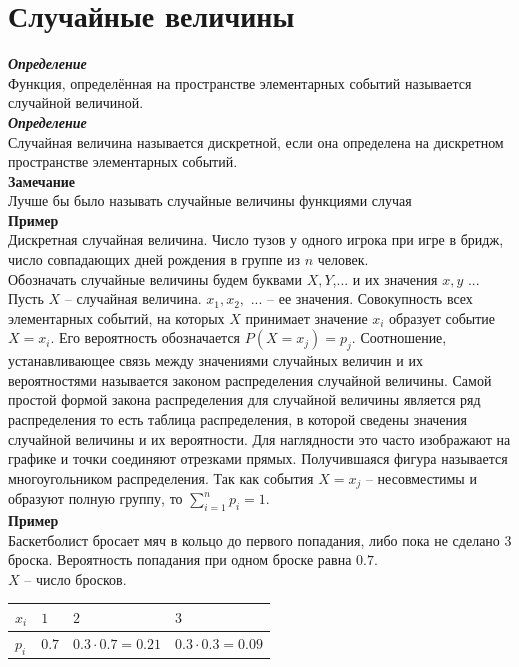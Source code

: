 \documentclass[russian, 12pt, fleqn]{article}
\begin{document}
\section{Случайные величины}
\noindent
\textit{\textbf{Определение}}\\
Функция, определённая на пространстве элементарных событий называется случайной величиной.\\
\textit{\textbf{Определение}}\\
Случайная величина называется дискретной, если она определена на дискретном пространстве элементарных событий.\\
\textbf{Замечание\ } \\ Лучше бы было называть случайные величины функциями случая\\
\textbf{Пример\ }\\Дискретная случайная величина. Число тузов у одного игрока при игре в бридж, число совпадающих дней рождения в группе из $n$ человек.\\
Обозначать случайные величины будем буквами $X, Y$,... и их значения $x, y$ ...
Пусть $X$ -- случайная величина. $x_1, x_2,$ ...  --  ее значения. Совокупность всех элементарных событий, на которых $X$ принимает значение $x_i$ образует событие $X=x_i$.
Его вероятность обозначается $P(X=x_j) = p_j$. Соотношение, устанавливающее связь между значениями случайных величин и их вероятностями называется законом распределения случайной величины. Самой простой формой закона распределения для случайной величины является ряд распределения то есть таблица распределения, в которой сведены значения случайной величины и их вероятности. Для наглядности это часто изображают на графике и точки соединяют отрезками прямых. Получившаяся фигура называется многоугольником распределения. Так как события $X=x_j$ -- несовместимы и образуют полную группу, то $\sum\limits_{i = 1}^{n}p_i = 1$.\\
\textbf{Пример\ }\\
Баскетболист бросает мяч в кольцо до первого попадания, либо пока не сделано 3 броска. Вероятность попадания при одном броске равна $0.7$.\\
$X$ -- число бросков.\\
\begin{tabular}[b]{ | l | l | l | l | }
\hline
$x_i$&$1$&$2$&$3$\\
\hline
$p_i$&$0.7$&$0.3\cdot0.7=0.21$&$0.3\cdot0.3 = 0.09$\\
\hline
\end{tabular}
\\
\end{document}

